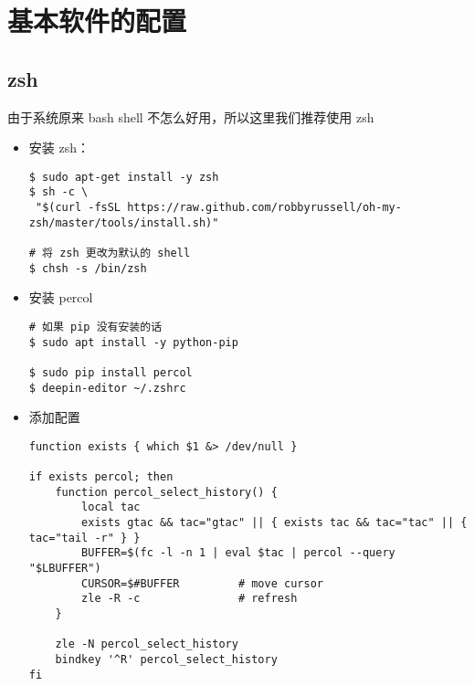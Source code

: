 \chapter{基本软件的配置}
\section{zsh}
由于系统原来 bash shell 不怎么好用，所以这里我们推荐使用 zsh \\

\begin{itemize}
\item 安装 zsh：
\begin{lstlisting}
$ sudo apt-get install -y zsh
$ sh -c \
 "$(curl -fsSL https://raw.github.com/robbyrussell/oh-my-zsh/master/tools/install.sh)"

# 将 zsh 更改为默认的 shell 
$ chsh -s /bin/zsh 
\end{lstlisting}

\item 安装 percol
\begin{lstlisting}
# 如果 pip 没有安装的话
$ sudo apt install -y python-pip
 
$ sudo pip install percol
$ deepin-editor ~/.zshrc 
\end{lstlisting}

\item 添加配置
\begin{lstlisting}
function exists { which $1 &> /dev/null }

if exists percol; then
    function percol_select_history() {
        local tac
        exists gtac && tac="gtac" || { exists tac && tac="tac" || { tac="tail -r" } }
        BUFFER=$(fc -l -n 1 | eval $tac | percol --query "$LBUFFER")
        CURSOR=$#BUFFER         # move cursor
        zle -R -c               # refresh
    }

    zle -N percol_select_history
    bindkey '^R' percol_select_history
fi
\end{lstlisting}
\end{itemize}
\newpage

